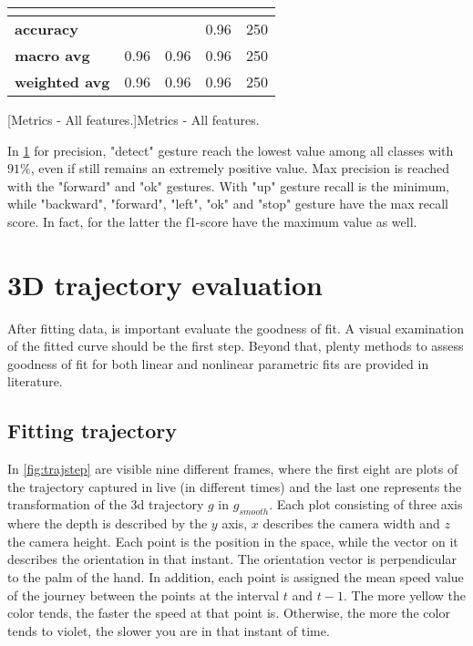 \begin{table}[H]
\begin{tabular}{|lllll|}
        \multicolumn{5}{|l|}{}                                                                                                                                                                   \\ \hline
        \multicolumn{1}{|l|}{\textbf{accuracy}}     & \multicolumn{2}{l|}{}                                                          & \multicolumn{1}{l|}{0.96}              & 250              \\ \hline
        \multicolumn{1}{|l|}{\textbf{macro avg}}    & \multicolumn{1}{l|}{0.96}               & \multicolumn{1}{l|}{0.96}            & \multicolumn{1}{l|}{0.96}              & 250              \\ \hline
        \multicolumn{1}{|l|}{\textbf{weighted avg}} & \multicolumn{1}{l|}{0.96}               & \multicolumn{1}{l|}{0.96}            & \multicolumn{1}{l|}{0.96}              & 250              \\ \hline
    \end{tabular}
	[Metrics - All features.]{Metrics - All features.}
    \label{tab:featuresall}
\end{table}

\noindent In \ref{tab:featuresall} for precision, "detect" gesture reach the lowest value among all classes with $91\%$, even if still remains an extremely positive value. Max precision is reached with the "forward" and "ok" gestures. With "up" gesture recall is the minimum, while "backward", "forward", "left", "ok" and "stop" gesture have the max recall score. In fact, for the latter the f1-score have the maximum value as well.

\section{3D trajectory evaluation}
\label{sec:3dtrajeval}
After fitting data, is important evaluate the goodness of fit. A visual examination of the fitted curve should be the first step. Beyond that, plenty methods to assess goodness of fit for both linear and nonlinear parametric fits are provided in literature.

\subsection{Fitting trajectory}
\label{sec:fittraj}
In \ref{fig:trajstep} are visible nine different frames, where the first eight are plots of the trajectory captured in live (in different times) and the last one represents the transformation of the \gls{3d} trajectory $g$ in $g_{smooth}$. Each plot consisting of three axis where the depth is described by the $y$ axis, $x$ describes the camera width and $z$ the camera height. Each point is the position in the space, while the vector on it describes the orientation in that instant. The orientation vector is perpendicular to the palm of the hand. In addition, each point is assigned the mean speed value of the journey between the points at the interval $t$ and $t-1$. The more yellow the color tends, the faster the speed at that point is. Otherwise, the more the color tends to violet, the slower you are in that instant of time.


